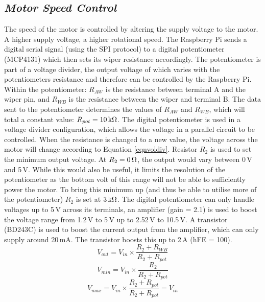 \documentclass[twoside,a4]{report}
\def\br{\newline \newline \noindent}
\begin{document}
	\subsection*{\textit{Motor Speed Control}} %
	The speed of the motor is controlled by altering the supply voltage to the motor. A higher supply voltage, a higher rotational speed. The Raspberry Pi sends a digital serial signal (using the SPI protocol) to a digital potentiometer (MCP4131) which then sets its wiper resistance accordingly. The potentiometer is part of a voltage divider, the output voltage of which varies with the potentiometers resistance and therefore can be controlled by the Raspberry Pi.
	\br
	Within the potentiometer: \(R_{AW}\) is the resistance between terminal A and the wiper pin, and \(R_{WB}\) is the resistance between the wiper and terminal B. The data sent to the potentiometer determines the values of \(R_{AW}\) and \(R_{WB}\), which will total a constant value: \(R_{pot} = 10\,{\rm k\Omega} \). The digital potentiometer is used in a voltage divider configuration, which allows the voltage in a parallel circuit to be controlled. When the resistance is changed to a new value, the voltage across the motor will change according to Equation \ref{eqnvoldiv}. Resistor \(R_2\) is used to set the minimum output voltage. At \(R_2 = 0\,{\rm\Omega}\), the output would vary between 0\,V and 5\,V. While this would also be useful, it limits the resolution of the potentiometer as the bottom volt of this range will not be able to sufficiently power the motor. To bring this minimum up (and thus be able to utilise more of the potentiometer) \(R_2\) is set at \(3\,{\rm k\Omega} \). The digital potentiometer can only handle voltages up to 5\,V across its terminals, an amplifier (gain = 2.1) is used to boost the voltage range from 1.2\,V to 5\,V up to 2.52\,V to 10.5\,V. A transistor (BD243C) is used to boost the current output from the amplifier, which can only supply around 20\,mA. The transistor boosts this up to 2\,A (hFE = 100).
	\begin{equation}
	V_{out} = V_{in}\times \frac{R_2 + R_{WB}}{R_2 + R_{pot}}
	\label{eqnvoldiv}
	\end{equation}
	\begin{equation}
	V_{min} = V_{in}\times \frac{R_2}{R_2 + R_{pot}}
	\label{eqnminvol}
	\end{equation}
	\begin{equation}
	V_{max} = V_{in}\times \frac{R_2 + R_{pot}}{R_2 + R_{pot}} = V_{in}
	\label{eqnmaxvol}
	\end{equation}
	
\end{document}
